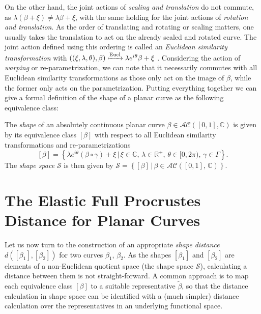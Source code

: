 On the other hand, the joint actions of \emph{scaling and translation} do not commute, as $\lambda(\beta + \xi) \neq \lambda\beta + \xi$, with the same holding for the joint actions of \emph{rotation and translation}.
As the order of translating and rotating or scaling  matters, one usually takes the translation to act on the already scaled and rotated curve.
The joint action defined using this ordering is called an \emph{Euclidean similarity transformation} with $\left((\xi, \lambda, \theta), \beta\right) \xmapsto{\text{Eucl}} \lambda e^{i\theta} \beta + \xi$ \parencite[see][62]{DrydenMardia2016}.
Considering the action of \emph{warping} or re-parametrization, we can note that it necessarily commutes with all Euclidean similarity transformations as those only act on the image of $\beta$, while the former only acts on the parametrization.
Putting everything together we can give a formal definition of the shape of a planar curve as the following equivalence class:
\begin{definition}[Shape]
  The \emph{shape} of an absolutely continuous planar curve $\beta \in \mathcal{AC}([0,1], \mathbb{C})$ is given by its equivalence class $[\beta]$ with respect to all Euclidean similarity transformations and re-parametrizations
  $$ [\beta] = \left\{\lambda e^{i\theta}(\beta \circ \gamma) + \xi\,|\, \xi \in \mathbb{C},\, \lambda \in \mathbb{R}^+,\, \theta \in [0,2\pi),\, \gamma \in \Gamma\right\}. $$
  The \emph{shape space} $\mathcal{S}$ is then given by $\mathcal{S} = \left\{[\beta]\,|\,\beta \in \mathcal{AC}([0,1],\, \mathbb{C})\right\}$. 
\end{definition}


\section{The Elastic Full Procrustes Distance for Planar Curves}
\label{sec:2-dist}
Let us now turn to the construction of an appropriate \emph{shape distance} $d([\beta_1], [\beta_2])$ for two curves $\beta_1$, $\beta_2$.
As the shapes $[\beta_1]$ and $[\beta_2]$ are elements of a non-Euclidean quotient space (the shape space $\mathcal{S}$), calculating a distance between them is not straight-forward.
A common approach is to map each equivalence class $[\beta]$ to a suitable representative $\widetilde \beta$, so that the distance calculation in shape space can be identified with a (much simpler) distance calculation over the representatives in an underlying functional space.


